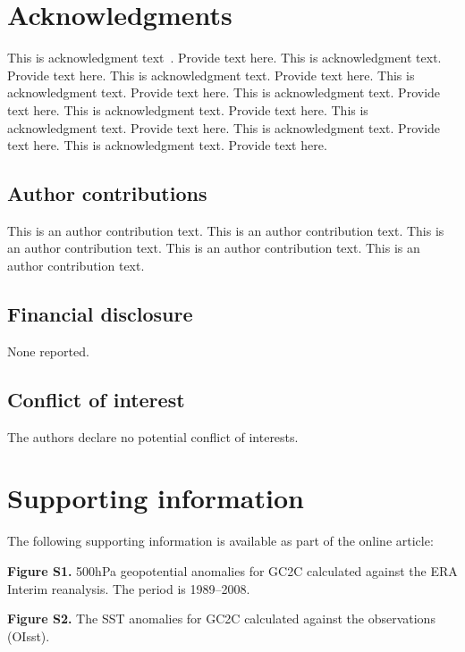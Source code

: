 \documentclass[AMS,STIX2COL]{WileyNJD-v2}
\begin{document}

    \section*{Acknowledgments}
    This is acknowledgment text~\cite{Elbaum2002}. Provide text here. This is acknowledgment text. Provide text here. This is acknowledgment text. Provide text here. This is acknowledgment text. Provide text here. This is acknowledgment text. Provide text here. This is acknowledgment text. Provide text here. This is acknowledgment text. Provide text here. This is acknowledgment text. Provide text here. This is acknowledgment text. Provide text here.

    \subsection*{Author contributions}

    This is an author contribution text. This is an author contribution text. This is an author contribution text. This is an author contribution text. This is an author contribution text.

    \subsection*{Financial disclosure}

    None reported.

    \subsection*{Conflict of interest}

    The authors declare no potential conflict of interests.


    \section*{Supporting information}

    The following supporting information is available as part of the online article:

    \noindent
    \textbf{Figure S1.}
    {500{\uns}hPa geopotential anomalies for GC2C calculated against the ERA Interim reanalysis. The period is 1989--2008.}

    \noindent
    \textbf{Figure S2.}
    {The SST anomalies for GC2C calculated against the observations (OIsst).}


    \appendix
\end{document}
